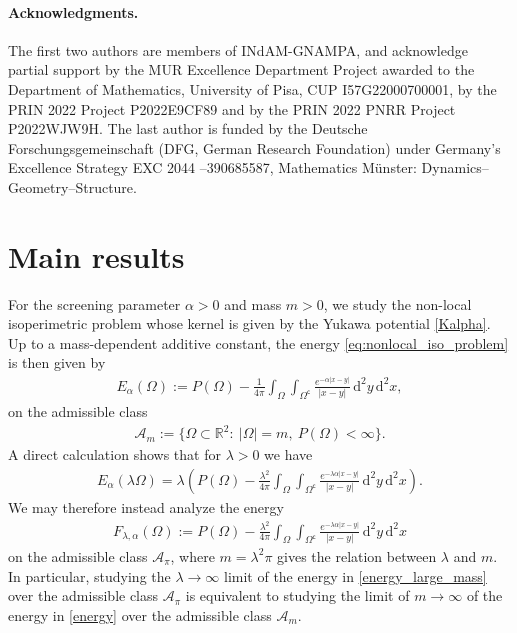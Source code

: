 \documentclass[11pt]{article}
\numberwithin{statement}{section}
\numberwithin{equation}{section}
\theoremstyle{remark}
\newcommand{\R}{\mathbb R} 				%
\newcommand{\intd}{\, \mathrm{d}} 				%
\newcommand{\stcomp}[1]{{#1}^{\mathsf{c}}}		%
\begin{document}
\paragraph{Acknowledgments.} The first two authors are members of
INdAM-GNAMPA, and acknowledge partial support by the MUR
Excellence Department Project awarded to the Department of
Mathematics, University of Pisa, CUP I57G22000700001, by the PRIN 2022
Project P2022E9CF89 and by the PRIN 2022 PNRR Project P2022WJW9H.  The
last author is funded by the Deutsche Forschungsgemeinschaft (DFG,
German Research Foundation) under Germany's Excellence Strategy EXC
2044 –390685587, Mathematics Münster: Dynamics–Geometry–Structure.

\section{Main results}
\label{sec:main}

For the screening parameter $\alpha>0$ and mass $m>0$,
we study the non-local isoperimetric problem whose kernel is
given by the Yukawa potential \eqref{Kalpha}. Up to a mass-dependent
additive constant, the energy \eqref{eq:nonlocal_iso_problem} is then
given by
\begin{align}\label{energy}
  E_{\alpha}(\Omega):= P(\Omega) -
  \frac{1}{4\pi}\int_\Omega\int_{\stcomp{\Omega}}
  \frac{e^{-\alpha|x-y|}}{|x-y|} \intd^2 y \intd^2 x ,
\end{align}
on the admissible class
\begin{align}\label{admissible_class}
  \mathcal{A}_m := \{\Omega \subset \R^2: \ |\Omega| = m, \
  P(\Omega) <\infty\}. 
\end{align}
A direct calculation shows that for $\lambda >0$ we have
	\begin{align*}
          E_{\alpha}(\lambda\Omega) = \lambda \left( P(\Omega) -
          \frac{\lambda^2}{4\pi}\int_\Omega\int_{\stcomp{\Omega}}
          \frac{e^{-\lambda \alpha |x-y|}}{|x-y|} \intd^2 y \intd^2 x
          \right). 
	\end{align*}
We may therefore instead analyze the energy
\begin{align}\label{energy_large_mass}
  F_{\lambda , \alpha}(\Omega):= P(\Omega) - \frac{\lambda
  ^2}{4\pi}\int_\Omega\int_{\stcomp{\Omega}} \frac{e^{-\lambda
  \alpha |x-y|}}{|x-y|} \intd^2 y \intd^2 x 
\end{align}
on the admissible class $\mathcal{A}_\pi$, where $m = \lambda^2\pi$
gives the relation between $\lambda$ and $m$. In particular, studying
the $\lambda \to \infty$ limit of the energy in
\eqref{energy_large_mass} over the admissible class $\mathcal A_\pi$
is equivalent to studying the limit of $m \to \infty$ of the energy in
\eqref{energy} over the admissible class $\mathcal A_m$.
\end{document}
